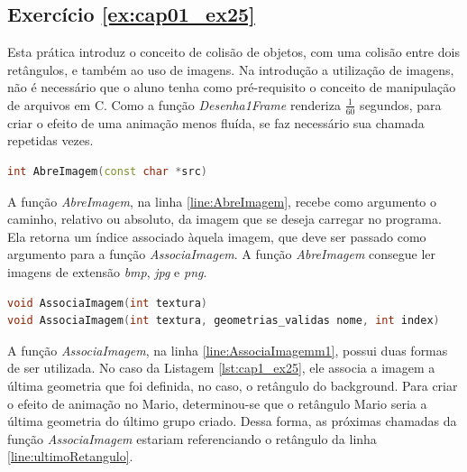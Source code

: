 \subsection*{Exercício \ref{ex:cap01_ex25}}
Esta prática introduz o conceito de colisão de objetos, com uma colisão entre dois retângulos, e também ao uso de imagens. Na introdução a utilização de imagens, não é necessário que o aluno tenha como pré-requisito o conceito de manipulação de arquivos em C. Como a função \emph{Desenha1Frame} renderiza $\frac{1}{60}$ segundos, para criar o efeito de uma animação menos fluída, se faz necessário sua chamada repetidas vezes.



\begin{lstlisting}[label={func:AbreImagem},language=C++]
int AbreImagem(const char *src)
\end{lstlisting}
A função \emph{AbreImagem}, na linha \ref{line:AbreImagem}, recebe como argumento o caminho, relativo ou absoluto, da imagem que se deseja carregar no programa. Ela retorna um índice associado àquela imagem, que deve ser passado como argumento para a função \emph{AssociaImagem}. A função \emph{AbreImagem} consegue ler imagens de extensão \emph{bmp}, \emph{jpg} e \emph{png}.

\begin{lstlisting}[label={func:AssociaImagem},language=C++]
void AssociaImagem(int textura)
void AssociaImagem(int textura, geometrias_validas nome, int index)
\end{lstlisting}
A função \emph{AssociaImagem}, na linha \ref{line:AssociaImagemm1}, possui duas formas de ser utilizada. No caso da Listagem \ref{lst:cap1_ex25}, ele associa a imagem a última geometria que foi definida, no caso, o retângulo do background. Para criar o efeito de animação no Mario, determinou-se que o retângulo Mario seria a última geometria do último grupo criado. Dessa forma, as próximas chamadas da função \emph{AssociaImagem} estariam referenciando o retângulo da linha \ref{line:ultimoRetangulo}.

